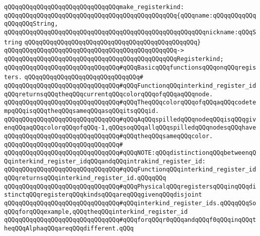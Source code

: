 \verb|qQQqqQQqqQQqqQQqqQQqqQQqqQQqqQQqmake_registerkind:|\newline
\verb|qQQqqQQqqQQqqQQqqQQqqQQqqQQqqQQqqQQqqQQqqQQqqQQq{qQQqname:qQQqqQQqqQQqqQQqqQQqString,|\newline
\verb|qQQqqQQqqQQqqQQqqQQqqQQqqQQqqQQqqQQqqQQqqQQqqQQqqQQqqQQqnickname:qQQqString|\newline
\verb|qQQqqQQqqQQqqQQqqQQqqQQqqQQqqQQqqQQqqQQqqQQqqQQq}|\newline
\verb|qQQqqQQqqQQqqQQqqQQqqQQqqQQqqQQqqQQqqQQqqQQqqQQq->|\newline
\verb|qQQqqQQqqQQqqQQqqQQqqQQqqQQqqQQqqQQqqQQqqQQqqQQqRegisterkind;|\newline
\newline
\newline
\verb|qQQqqQQqqQQqqQQqqQQqqQQqqQQqqQQq#qQQqBasicqQQqfunctionsqQQqonqQQqregisters.|\newline
\verb|qQQqqQQqqQQqqQQqqQQqqQQqqQQqqQQq#|\newline
\verb|qQQqqQQqqQQqqQQqqQQqqQQqqQQqqQQq#qQQqFunctionqQQqinterkind_register_idqQQqreturnsqQQqtheqQQqcurrentqQQqcolorqQQqofqQQqaqQQqnode.|\newline
\verb|qQQqqQQqqQQqqQQqqQQqqQQqqQQqqQQq#qQQqTheqQQqcolorqQQqofqQQqaqQQqcodetempqQQqisqQQqtheqQQqsameqQQqasqQQqitsqQQqid.|\newline
\verb|qQQqqQQqqQQqqQQqqQQqqQQqqQQqqQQq#qQQqAqQQqspilledqQQqnodeqQQqisqQQqgivenqQQqaqQQqcolorqQQqofqQQq-1,qQQqsoqQQqallqQQqspilledqQQqnodesqQQqhave|\newline
\verb|qQQqqQQqqQQqqQQqqQQqqQQqqQQqqQQq#qQQqtheqQQqsameqQQqcolor.|\newline
\verb|qQQqqQQqqQQqqQQqqQQqqQQqqQQqqQQq#|\newline
\verb|qQQqqQQqqQQqqQQqqQQqqQQqqQQqqQQq#qQQqNOTE:qQQqdistinctionqQQqbetweenqQQqinterkind_register_idqQQqandqQQqintrakind_register_id:|\newline
\verb|qQQqqQQqqQQqqQQqqQQqqQQqqQQqqQQq#qQQqFunctionqQQqinterkind_register_idqQQqreturnsqQQqinterkind_register_id.qQQqqQQq|\newline
\verb|qQQqqQQqqQQqqQQqqQQqqQQqqQQqqQQq#qQQqPhysicalqQQqregistersqQQqinqQQqdistinctqQQqregisterqQQqkindsqQQqareqQQqgivenqQQqdisjoint|\newline
\verb|qQQqqQQqqQQqqQQqqQQqqQQqqQQqqQQq#qQQqinterkind_register_ids.qQQqqQQqSoqQQqforqQQqexample,qQQqtheqQQqinterkind_register_id|\newline
\verb|qQQqqQQqqQQqqQQqqQQqqQQqqQQqqQQq#qQQqforqQQqr0qQQqandqQQqf0qQQqinqQQqtheqQQqAlphaqQQqareqQQqdifferent.qQQq|\newline
